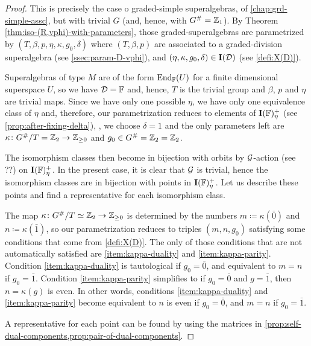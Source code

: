 \begin{proof}
    This is precisely the case o graded-simple superalgebras, of \cref{chap:grd-simple-assc}, but with trivial $G$ (and, hence, with $G^\# = \mathbb{Z}_1$). 
    By Theorem \ref{thm:iso-(R,vphi)-with-parameters}, those graded-superalgebras are parametrized by $(T, \beta, p, \eta, \kappa, g_0, \delta)$ where $(T, \beta, p)$ are associated to a graded-division superalgebra (see \cref{ssec:param-D-vphi}), and $(\eta, \kappa, g_0, \delta) \in \mathbf{I}(\mathcal{D})$ (see \cref{defi:X(D)}). 
    
    Superalgebras of type $M$ are of the form $\operatorname{End}_{\mathbb{F}} (U)$ for a finite dimensional superspace $U$, so we have $\mathcal{D} = \mathbb{F}$ and, hence, $T$ is the trivial group and $\beta$, $p$ and $\eta$ are trivial maps. 
    Since we have only one possible $\eta$, we have only one equivalence class of $\eta$ and, therefore, our parametrization reduces to elements of $\mathbf{I}(\mathbb{F})_\eta^+$ (see \cref{prop:after-fixing-delta}), \ie, we choose $\delta = 1$ and the only parameters left are $\kappa\colon G^\#/T = \mathbb{Z}_2 \to \mathbb{Z}_{\geq 0}$ and $g_0 \in G^\# = \mathbb{Z}_2 = \mathbb{Z}_2$. 
    
    The isomorphism classes then become in bijection with orbits by $\mathcal G$-action (see ??) on $\mathbf{I}(\mathbb{F})_\eta^+$. 
    In the present case, it is clear that $\mathcal G$ is trivial, hence the isomorphism classes are in bijection with points in $\mathbf{I}(\mathbb{F})_\eta^+$. 
    Let us describe these points and find a representative for each isomorphism class. 
    
    The map $\kappa\colon G^\#/T \simeq \mathbb{Z}_2 \to \mathbb{Z}_{\geq 0}$ is determined by the numbers $m \coloneqq \kappa(\bar 0)$ and $n \coloneqq \kappa(\bar 1)$, so our parametrization reduces to triples $(m,n,g_0)$ satisfying some conditions that come from \cref{defi:X(D)}. 
    The only of those conditions  that are not automatically satisfied are \eqref{item:kappa-duality} and \eqref{item:kappa-parity}. 
    Condition \eqref{item:kappa-duality} is tautological if $g_0 = \bar 0$, and equivalent to $m=n$ if $g_0 = \bar 1$. 
    Condition \eqref{item:kappa-parity} simplifies to if $g_0 = \bar 0$ and $g = \bar 1$, then $n = \kappa (g)$ is even. 
    In other words, conditions \eqref{item:kappa-duality} and \eqref{item:kappa-parity} become equivalent to $n$ is even if $g_0 = \bar 0$, and $m = n$ if $g_0= \bar 1$. 
    
    A representative for each point can be found by using the matrices in \cref{prop:self-dual-components,prop:pair-of-dual-components}. 
\end{proof}

